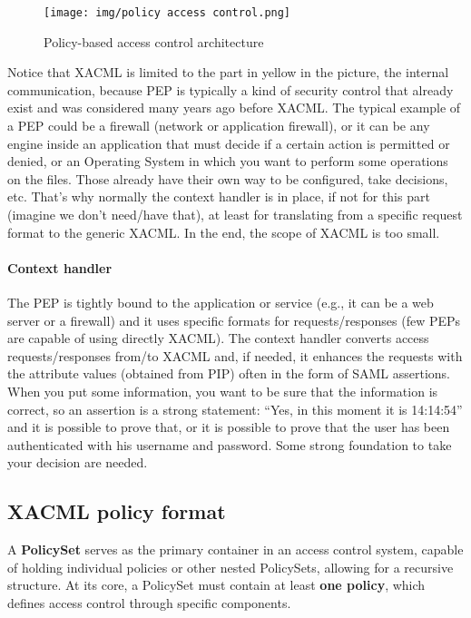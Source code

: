 \begin{figure}[H]
  \centering
  \texttt{[image: img/policy access
  control.png]}
  \caption{Policy-based access control architecture}
  \label{fig:policy access control}
\end{figure}

Notice that XACML is limited to the part in yellow in the picture, the
internal communication, because PEP is typically a kind of security
control that already exist and was considered many years ago before
XACML. The typical example of a PEP could be a firewall (network or
application firewall), or it can be any engine inside an application
that must decide if a certain action is permitted or denied, or an
Operating System in which you want to perform some operations on the
files. Those already have their own way to be configured, take
decisions, etc. That’s why normally the context handler is in place,
if not for this part (imagine we don’t need/have that), at least for
translating from a specific request format to the generic XACML. In
the end, the scope of XACML is too small.

\paragraph{Context handler}
The PEP is tightly bound to the application or service (e.g., it can
be a web server or a firewall) and it uses specific formats for
requests/responses (few PEPs are capable of using directly XACML). The
context handler converts access requests/responses from/to XACML and,
if needed, it enhances the requests with the attribute values
(obtained from PIP) often in the form of SAML assertions. When you put
some information, you want to be sure that the information is correct,
so an assertion is a strong statement: “Yes, in this moment it is
14:14:54” and it is possible to prove that, or it is possible to prove
that the user has been authenticated with his username and password.
Some strong foundation to take your decision are needed.

\subsection{XACML policy format}
A \textbf{PolicySet} serves as the primary container in an access
control system, capable of holding individual policies or other nested
PolicySets, allowing for a recursive structure. At its core, a
PolicySet must contain at least \textbf{one policy}, which defines
access control through specific components.

